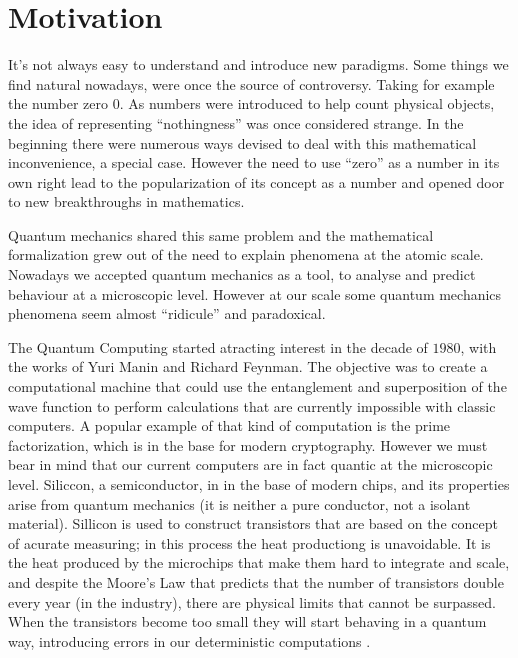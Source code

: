 \section{Motivation}
\label{sec:int_motivation}



It's not always easy to understand and introduce new paradigms. Some things we find natural nowadays, were once the source of controversy. Taking for example the number zero $0$. As numbers were introduced to help count physical objects, the idea of representing ``nothingness'' was once considered strange. In the beginning there were numerous ways devised to deal with this mathematical inconvenience, a special case. However the need to use ``zero'' as a number in its own right lead to the popularization of its concept as a number and opened door to new breakthroughs in mathematics\cite{Kaplan2000}. 

Quantum mechanics shared this same problem and the mathematical formalization grew out of the need to explain phenomena at the atomic scale\cite{Mehra1982}. Nowadays we  accepted quantum mechanics as a tool, to analyse and predict behaviour at a microscopic level. However at our scale some quantum mechanics phenomena seem almost ``ridicule'' and paradoxical.

The Quantum Computing started atracting interest in the decade of $1980$, with the works of Yuri Manin and Richard Feynman. The objective was to create a computational machine that could use the entanglement and superposition of the wave function to perform calculations that are currently impossible with classic computers. A popular example of that kind of computation is the prime factorization, which is in the base for modern cryptography. 
However we must bear in mind that our current computers are in fact quantic at the microscopic level. 
Siliccon, a semiconductor, in in the base of modern chips, and its properties arise from quantum mechanics (it is neither a pure conductor, not a isolant material). Sillicon is used to construct transistors that are based on the concept of acurate measuring; in this process the heat productiong is unavoidable. It is the heat produced by the microchips that make them hard to integrate and scale, and despite the Moore's Law that predicts that the number of transistors double every year (in the industry), there are physical limits that cannot be surpassed. When the transistors become too small they will start behaving in a quantum way, introducing errors in our deterministic computations \cite{Laughlin2005}.







